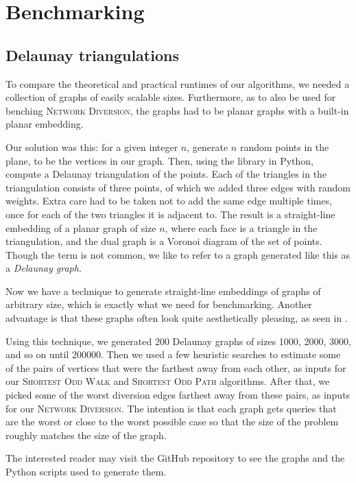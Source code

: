 \section{Benchmarking}


\subsection{Delaunay triangulations}
\label{subsection:delaunay}
To compare the theoretical and practical runtimes of our algorithms, we needed a collection of graphs of easily scalable sizes. Furthermore, as to also be used for benching \textsc{Network Diversion}, the graphs had to be planar graphs with a built-in planar embedding.

Our solution was this: for a given integer $n$, generate $n$ random points in the plane, to be the vertices in our graph. Then, using the  library in Python, compute a Delaunay triangulation of the points. Each of the triangles in the triangulation consists of three points, of which we added three edges with random weights. Extra care had to be taken not to add the same edge multiple times, once for each of the two triangles it is adjacent to. The result is a straight-line embedding of a planar graph of size $n$, where each face is a triangle in the triangulation, and the dual graph is a Voronoi diagram of the set of points. Though the term is not common, we like to refer to a graph generated like this as a \emph{Delaunay graph}.

Now we have a technique to generate straight-line embeddings of graphs of arbitrary size, which is exactly what we need for benchmarking. Another advantage is that these graphs often look quite aesthetically pleasing, as seen in .

Using this technique, we generated 200 Delaunay graphs of sizes 1000, 2000, 3000, and so on until 200000. Then we used a few heuristic searches to estimate some of the pairs of vertices that were the farthest away from each other, as inputs for our \textsc{Shortest Odd Walk} and \textsc{Shortest Odd Path} algorithms. After that, we picked some of the worst diversion edges farthest away from these pairs, as inputs for our \textsc{Network Diversion}. The intention is that each graph gets queries that are the worst or close to the worst possible case so that the size of the problem roughly matches the size of the graph.

The interested reader may visit the GitHub repository \cite{source:codebase} to see the graphs and the Python scripts used to generate them.
